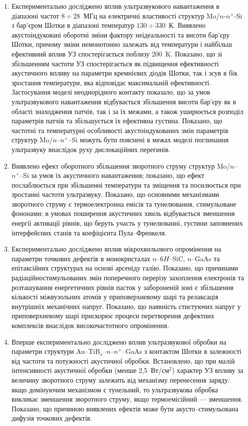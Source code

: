 \begin{enumerate}
\item
Експериментально досліджено вплив ультразвукового навантаження в діапазоні частот $8\div28$~МГц на електричні властивості структур Mo/$n$-$n^{+}$-Si з бар'єром Шотки в діапазоні температур $130\div330$~К.
 Виявлено акустоіндуковані оборотні зміни фактору неідеальності та висоти бар'єру Шотки, причому зміни немонотонно залежать від температури і найбільш ефективний вплив УЗ спостерігається поблизу 200~K.
  Показано, що зі збільшенням частоти УЗ  спостерігається як підвищення ефективності акустичного впливу на параметри кремнієвих діодів Шотки,
так і зсув в бік зростання температури, яка відповідає максимальній ефективності.
 Застосування моделі неоднорідного контакту показало, що за умов ультразвукового навантаження відбувається збільшення висоти бар'єру як в області знаходження патчів, так і за їх межами, а також уширюється розподіл параметрів патчів та збільшується їх ефективна густина.
Показано, що частотні та температурні особливості акустоіндукованих змін параметрів структур Mo/$n$--$n^{+}$--Si можуть бути пояснені в межах
 моделі поглинання ультразвуку внаслідок руху дислокаційних перегинів.

\item Виявлено ефект оборотного збільшення зворотного струму структур Mo/$n$--$n^{+}$--Si за умов їх акустичного навантаження;
показано, що ефект послаблюється при збільшенні температури та зміщення та посилюється при зростанні частоти ультразвуку.
Показано, що основними механізмами зворотного струму є термоелектронна емісія та тунелювання, стимульоване фононами;
в умовах поширення акустичних хвиль відбувається зменшення енергії активації рівнів, що беруть участь у тунелюванні,
густини заповнених інтерфейсних станів та коефіцієнта Пула--Френкеля.

\item Експериментально досліджено вплив мікрохвильового опромінення на параметри точкових дефектів в монокристалах $n$--6$H$--SiC, $n$--GaAs та епітаксійних структурах на основі арсеніду галію.
Показано, що причинами радіаційностимульованих змін поперечного перерізу захоплення електронів та розташування енергетичних рівнів пасток у забороненій зоні є
збільшення кількості міжвузольних атомів у приповерхневому шарі та релаксація внутрішніх механічних напруг.
Показано, що наявність стистуючих напруг у приповерхневому шарі прискорює процеси перетворення дефектних комплексів внаслідок високочастотного опромінення.

\item Вперше експериментально досліджено вплив ультразвукової обробки на параметри структури Au--TiB$_x$--$n$--$n^+$--GaAs з контактом Шотки
 в залежності від частоти та потужності акустичної обробки.
Встановлено, що при малій інтенсивності акустичної обробки (менше 2,5~Вт/см$^2$) характер УЗ впливу за величину зворотного струму залежить від механізму перенесення заряду:
  якщо домінуючим механізмом є тунельний, то ультразвукова обробка викликає зменшення зворотного струму, якщо термоемісійний --- зменшення.
  Показано, що причиною виявлених ефектів може бути акусто--стимульована дифузія точкових дефектів.




\end{enumerate}
